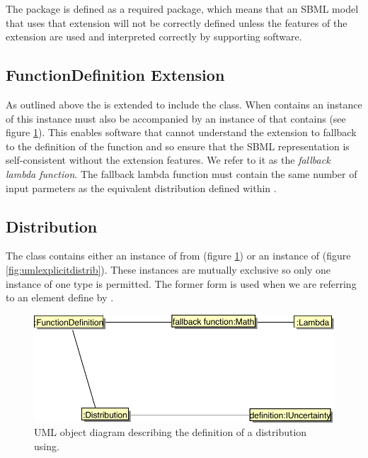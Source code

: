 \documentclass[draftspec]{sbmlpkgspec}
\begin{document}
The \distrib package is defined as a required package, which means
that an SBML model that uses that extension will not be correctly
defined unless the features of the extension are used and interpreted
correctly by supporting software.

\subsection{FunctionDefinition Extension}

As outlined above the \FunctionDefinition is extended to include the
\Distribution class. When \FunctionDefinition contains an instance of
\Distribution this instance must also be accompanied \watchout by an
instance of \mmath that contains \mlambda (see figure
\ref{fig:umluncertmldistrib}). This enables software that cannot understand the
extension to fallback to the \mlambda definition of the function and
so ensure that the SBML representation is self-consistent without the
extension features. We refer to it as the \emph{fallback lambda
  function}.  The fallback lambda function must contain the same
number of input parmeters as the equivalent distribution defined
within \Distribution.

\subsection{Distribution}
\label{sec:distribution}

The  class contains either an instance of
\unidistrib from \uncertml (figure \ref{fig:umluncertmldistrib}) or an
instance of \mlambda (figure \ref{fig:umlexplicitdistrib}). These instances
are mutually exclusive so only one instance of one type is
permitted. The former form is used when we are referring to an
element define by \uncertml.

\begin{figure}[htb]
\includegraphics[width=0.7\linewidth]{uncertmlDistrib.pdf}
\caption{UML object diagram describing the definition of a
  distribution using\uncertml.}
\label{fig:umluncertmldistrib}
\end{figure}
 
\end{document}
